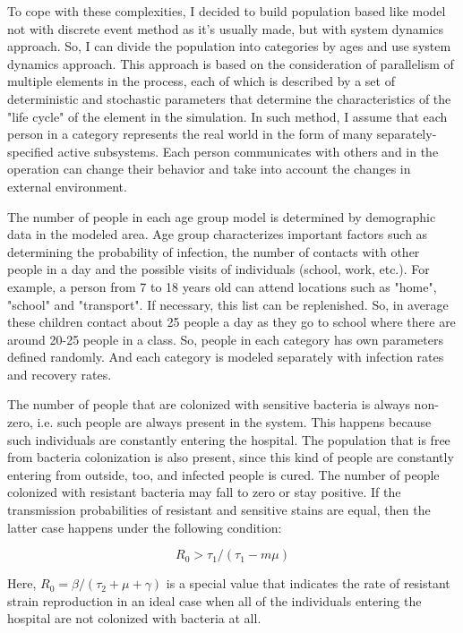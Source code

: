 To cope with these complexities, I decided to build population based like model not with discrete event method as it’s usually made, but with system dynamics approach. So, I can divide the population into categories by ages and use system dynamics approach. This approach is based on the consideration of parallelism of multiple elements in the process, each of which is described by a set of deterministic and stochastic parameters that determine the characteristics of the "life cycle" of the element in the simulation. In such method, I assume that each person in a category represents the real world in the form of many separately-specified active subsystems. Each person communicates with others and in the operation can change their behavior and take into account the changes in external environment.

The number of people in each age group model is determined by demographic data in the modeled area. Age group characterizes important factors such as determining the probability of infection, the number of contacts with other people in a day and the possible visits of individuals (school, work, etc.). For example, a person from 7 to 18 years old can attend locations such as "home", "school" and "transport". If necessary, this list can be replenished. So, in average these children contact about 25 people a day as they go to school where there are around 20-25 people in a class.  So, people in each category has own parameters defined randomly. And each category is modeled separately with infection rates and recovery rates.

The number of people that are colonized with sensitive bacteria is always non-zero, i.e. such people are always present in the system. This happens because such individuals are constantly entering the hospital. The population that is free from bacteria colonization is also present, since this kind of people are constantly entering from outside, too, and infected people is cured. The number of people colonized with resistant bacteria may fall to zero or stay positive. If the transmission probabilities of resistant and sensitive stains are equal, then the latter case happens under the following condition:

\begin{equation}
R_0 > \tau_1/(\tau_1 - m \mu)
\end{equation}

Here, $R_0 = \beta/(\tau_2 + \mu + \gamma)$ is a special value that indicates the rate of resistant strain reproduction in an ideal case when all of the individuals entering the hospital are not colonized with bacteria at all.